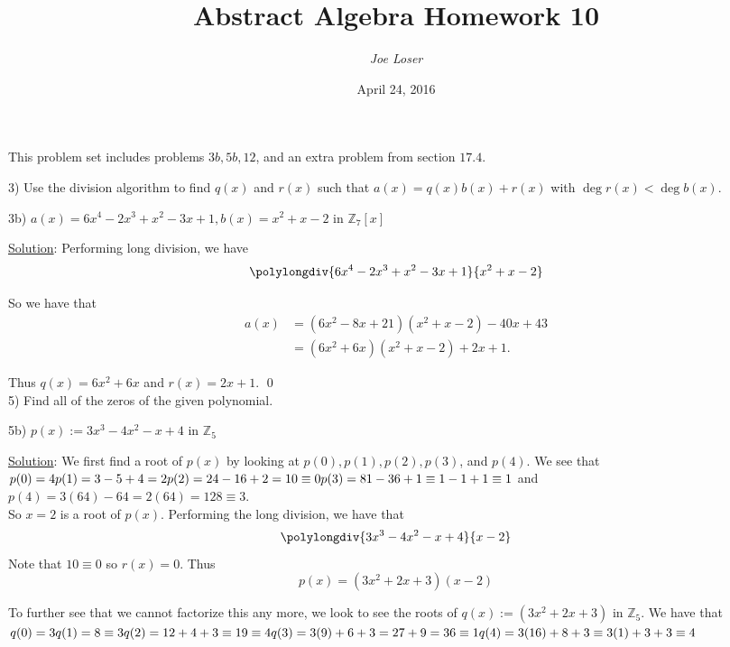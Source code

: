 \documentclass{article}
\title{Abstract Algebra Homework 10}
\author{\textit{Joe Loser}}
\date{April 24, 2016}
\begin{document}
\maketitle

This problem set includes problems $3b, 5b, 12$, and an extra problem from section $17.4$.

3) Use the division algorithm to find $q(x)$ and $r(x)$ such that $a(x) = q(x)b(x) + r(x)$ with $\deg r(x) < \deg b(x)$.

3b) $a(x) = 6x^4-2x^3+x^2-3x+1, b(x) = x^2 + x - 2$ in $\mathbb{Z}_7[x]$

\underline{Solution}: Performing long division, we have  $$\polylongdiv{6x^4-2x^3+x^2-3x+1}{x^2+x-2}$$

So we have that
\begin{align*}
	a(x) &= (6x^2-8x+21)(x^2+x-2) - 40x + 43 \\
	&= (6x^2+6x)(x^2+x-2) + 2x + 1.
\end{align*}

Thus $q(x) = 6x^2 + 6x$ and $r(x) = 2x + 1$. \qed \\

5) Find all of the zeros of the given polynomial.

5b) $p(x) := 3x^3-4x^2-x+4$ in $\mathbb{Z}_5$

\underline{Solution}: We first find a root of $p(x)$ by looking at $p(0), p(1), p(2), p(3)$, and $p(4)$. We see that
$\\p(0) = 4 \\
p(1) = 3 - 5 + 4 = 2 \\
p(2) = 24 - 16 + 2 = 10 \equiv 0 \\
p(3) = 81-36+1 \equiv 1-1+1 \equiv 1$ and \\
$p(4) = 3(64)-64 = 2(64) = 128 \equiv 3$. \\

So $x = 2$ is a root of $p(x)$. Performing the long division, we have that
$$ \polylongdiv{3x^3-4x^2-x+4}{x-2} $$
Note that $10 \equiv 0$ so $r(x) = 0$. Thus 
\begin{equation}
	p(x) = (3x^2+2x+3)(x-2)
\end{equation}

To further see that we cannot factorize this any more, we look to see the roots of $q(x) := (3x^2+2x+3)$ in $\mathbb{Z}_5$. We have that 
$\\q(0) = 3 \\
q(1) = 8 \equiv 3 \\
q(2) = 12 + 4 + 3 \equiv 19 \equiv 4 \\
q(3) = 3(9) + 6 + 3 = 27 + 9 = 36 \equiv 1 \\
q(4) = 3(16) + 8 + 3 \equiv 3(1) + 3 + 3 \equiv 4$ \\
\end{document}
